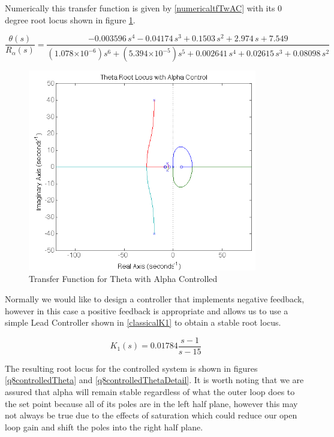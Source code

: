 \documentclass{article}
\theoremstyle{plain}
\theoremstyle{definition}
\theoremstyle{remark}
\providecommand{\e}[1]{\ensuremath{\times 10^{#1}}}
\begin{document}
Numerically this transfer function is given by \eqref{numericaltfTwAC} with its 0 degree root locus shown in figure \ref{q8thetawAlphaControl}.

\begin{equation}
\frac{\theta(s)}{R_{\alpha}(s)} = \frac{-0.003596 \, s^4 - 0.04174\,  s^3 + 0.1503 \, s^2 + 2.974\, s + 7.549}{(1.078\e{-6}) s^6 + (5.394\e{-5}) s^5 + 0.002641 \, s^4 + 0.02615 \, s^3 + 0.08098 \, s^2}
\label{numericaltfTwAC}
\end{equation}

\begin{figure}
\begin{center}
\includegraphics[width = 10cm]{thetaAlphaControl.png}
\end{center}
\caption{Transfer Function for Theta with Alpha Controlled}
\label{q8thetawAlphaControl}
\end{figure}

Normally we would like to design a controller that implements negative feedback, however in this case a positive feedback is appropriate and allows us to use a simple Lead Controller shown in \eqref{classicalK1} to obtain a stable root locus.

\begin{equation}
K_1(s) = 0.01784 \frac{s - 1}{s - 15}
\label{classicalK1}
\end{equation}

The resulting root locus for the controlled system is shown in figures \ref{q8controlledTheta} and \ref{q8controlledThetaDetail}.  It is worth noting that we are assured that alpha will remain stable regardless of what the outer loop does to the set point because all of its poles are in the left half plane, however this may not always be true due to the effects of saturation which could reduce our open loop gain and shift the poles into the right half plane. 
\end{document}
